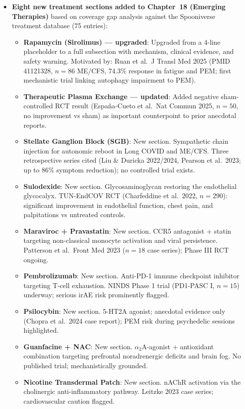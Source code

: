 \begin{itemize}
  \item \textbf{Eight new treatment sections added to Chapter~18 (Emerging Therapies)}
    based on coverage gap analysis against the Spooniverse treatment database (75 entries):
    \begin{itemize}
      \item \textbf{Rapamycin (Sirolimus) --- upgraded}: Upgraded from a 4-line placeholder to a
        full subsection with mechanism, clinical evidence, and safety warning.
        Motivated by: Ruan et al.\ J Transl Med 2025 (PMID 41121328, $n=86$ ME/CFS, 74.3\% response
        in fatigue and PEM; first mechanistic trial linking autophagy impairment to PEM).
        \cite{Ruan2025rapamycin, BarTana2025mTOR}
      \item \textbf{Therapeutic Plasma Exchange --- updated}: Added negative sham-controlled RCT result
        (España-Cueto et al.\ Nat Commun 2025, $n=50$, no improvement vs sham) as important
        counterpoint to prior anecdotal reports.
      \item \textbf{Stellate Ganglion Block (SGB)}: New section. Sympathetic chain injection for
        autonomic reboot in Long COVID and ME/CFS. Three retrospective series cited (Liu \& Duricka
        2022/2024, Pearson et al.\ 2023; up to 86\% symptom reduction); no controlled trial exists.
        \cite{Liu2022SGB, Pearson2023SGB, Duricka2024SGB}
      \item \textbf{Sulodexide}: New section. Glycosaminoglycan restoring the endothelial glycocalyx.
        TUN-EndCOV RCT (Charfeddine et al.\ 2022, $n=290$): significant improvement in endothelial
        function, chest pain, and palpitations vs untreated controls. \cite{Charfeddine2022sulodexide}
      \item \textbf{Maraviroc + Pravastatin}: New section. CCR5 antagonist + statin targeting
        non-classical monocyte activation and viral persistence. Patterson et al.\ Front Med 2023
        ($n=18$ case series); Phase III RCT ongoing. \cite{Patterson2023maraviroc}
      \item \textbf{Pembrolizumab}: New section. Anti-PD-1 immune checkpoint inhibitor targeting
        T-cell exhaustion. NINDS Phase 1 trial (PD1-PASC I, $n=15$) underway; serious irAE risk
        prominently flagged.
      \item \textbf{Psilocybin}: New section. 5-HT2A agonist; anecdotal evidence only (Chopra et al.\
        2024 case report); PEM risk during psychedelic sessions highlighted.
        \cite{Chopra2024psilocybin}
      \item \textbf{Guanfacine + NAC}: New section. $\alpha_2$A-agonist + antioxidant combination
        targeting prefrontal noradrenergic deficits and brain fog. No published trial; mechanistically
        grounded.
      \item \textbf{Nicotine Transdermal Patch}: New section. nAChR activation via the cholinergic
        anti-inflammatory pathway. Leitzke 2023 case series; cardiovascular caution flagged.
    \end{itemize}


\end{itemize}
